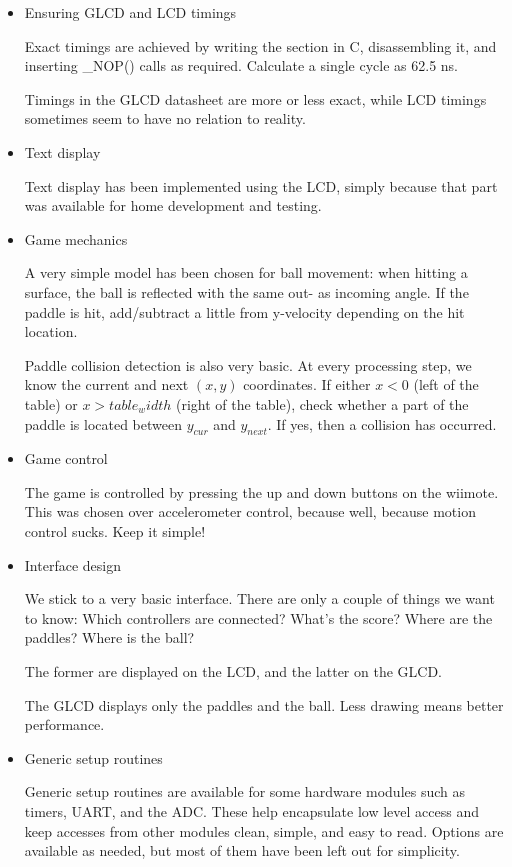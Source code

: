 \documentclass[12pt,a4paper,titlepage,oneside]{article}
\begin{document}
\begin{itemize}
 
 \item Ensuring GLCD and LCD timings
 
 Exact timings are achieved by writing the section in C, disassembling it, and inserting \_NOP()
 calls as required. Calculate a single cycle as 62.5 ns.
 
 Timings in the GLCD datasheet are more or less exact, while LCD timings sometimes seem to have
 no relation to reality.
 
 
 \item Text display
 
 Text display has been implemented using the LCD, simply because that part was available for home
 development and testing. 
 
 
 \item Game mechanics
 
 A very simple model has been chosen for ball movement: when hitting a surface, the ball
 is reflected with the same out- as incoming angle. If the paddle is hit, add/subtract a little
 from y-velocity depending on the hit location.
 
 Paddle collision detection is also very basic. At every processing step, we know the current and next
 $(x, y)$ coordinates. If either $x < 0$ (left of the table) or $x > \mathit{table_width}$ (right of the
 table), check whether a part of the paddle is located between $y_{cur}$ and $y_{next}$. 
 If yes, then a collision has occurred.
 
 
 \item Game control
 
 The game is controlled by pressing the up and down buttons on the wiimote. This was chosen
 over accelerometer control, because \textellipsis well, because motion control sucks. Keep it simple!
 
 
 \item Interface design
 
 We stick to a very basic interface. There are only a couple of things we want to know:
 Which controllers are connected? What's the score? Where are the paddles? Where is the ball?
 
 The former are displayed on the LCD, and the latter on the GLCD. 
 
 The GLCD displays only the paddles and the ball. Less drawing means better performance.
 
 
 \item Generic setup routines
 
 Generic setup routines are available for some hardware modules such as timers, UART,
 and the ADC. These help encapsulate low level access and keep accesses from other modules clean,
 simple, and easy to read. Options are available as needed, but most of them have been
 left out for simplicity.
 

\end{itemize}
\end{document}
